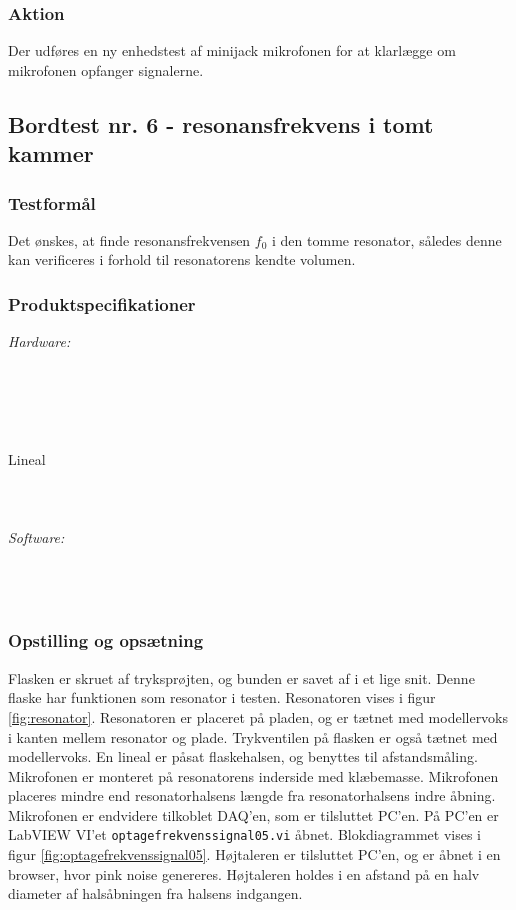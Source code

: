 			\subsubsection{Aktion}
			 Der udføres en ny enhedstest af minijack mikrofonen for at klarlægge om mikrofonen opfanger signalerne. 
			 
 	\subsection{Bordtest nr. 6 - resonansfrekvens i tomt kammer}
	
	\subsubsection{Testformål}
	Det ønskes, at finde resonansfrekvensen $f_{0}$ i den tomme resonator, således denne kan verificeres i forhold til resonatorens kendte volumen.  	
	
	\subsubsection{Produktspecifikationer}
	\textit{Hardware:}\\
	\\
	\elektretto\\
	\daq\\
	\\	
	\snot\\	
	Lineal\\
	\modellervoks\\
	\plade\\
	\PC\\
	
	\textit{Software:}\\
	\labview\\
	\daqsoft\\
	\onlineg\\
	
	\subsubsection{Opstilling og opsætning}
	Flasken er skruet af tryksprøjten, og bunden er savet af i et lige snit. Denne flaske har funktionen som resonator i testen. Resonatoren vises i figur \ref{fig:resonator}. Resonatoren er placeret på pladen, og er tætnet med modellervoks i kanten mellem resonator og plade. Trykventilen på flasken er også tætnet med modellervoks. En lineal er påsat flaskehalsen, og benyttes til afstandsmåling. Mikrofonen er monteret på resonatorens inderside med klæbemasse. Mikrofonen placeres mindre end resonatorhalsens længde fra  resonatorhalsens indre åbning. Mikrofonen er endvidere tilkoblet DAQ'en, som er tilsluttet PC'en. På PC'en er LabVIEW VI'et \texttt{optagefrekvenssignal05.vi} åbnet. Blokdiagrammet vises i figur \ref{fig:optagefrekvenssignal05}. Højtaleren er tilsluttet PC'en, og \onlineg er åbnet i en browser, hvor pink noise genereres. Højtaleren holdes i en afstand på en halv diameter af halsåbningen fra halsens indgangen.  
	
